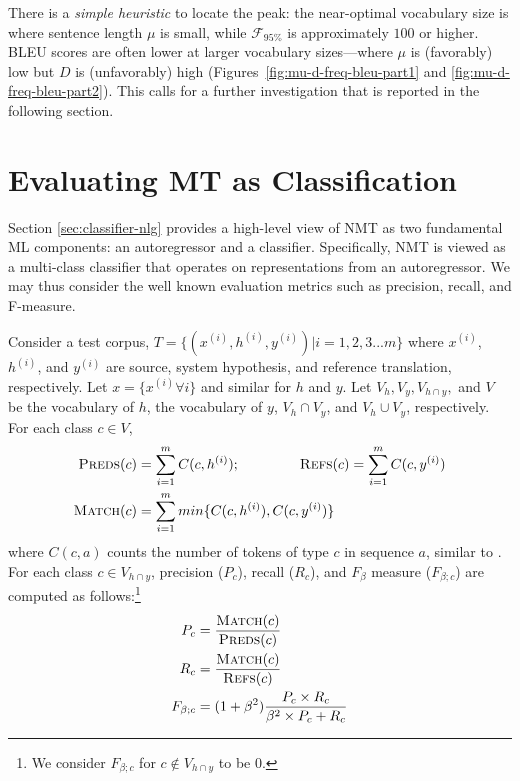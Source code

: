  There is a \textit{simple heuristic} to locate the peak: the near-optimal vocabulary size is where sentence length $\mu$ is small, while $\mathcal{F}_{95\%}$ is approximately $100$ or higher.
BLEU scores are often lower at larger vocabulary sizes---where $\mu$ is (favorably) low but $D$ is (unfavorably) high (Figures~\ref{fig:mu-d-freq-bleu-part1} and \ref{fig:mu-d-freq-bleu-part2}).
This calls for a further investigation that is reported in the following section.

\section{Evaluating MT as Classification}
\label{sec:mt-eval-as-cls}

Section \ref{sec:classifier-nlg} provides a high-level view of NMT as two fundamental ML components: an autoregressor and a classifier. 
Specifically, NMT is viewed as a multi-class classifier that operates on representations from an autoregressor.
We may thus consider the well known evaluation metrics such as precision, recall, and F-measure.

Consider a test corpus, $T = \{ (x^{(i)}, h^{(i)}, y^{(i)}) | i = 1,2,3...m \}$ where $x^{(i)}$, $h^{(i)}$, and $y^{(i)}$ are source, system hypothesis, and reference translation, respectively. Let $x = \{x^{(i)} \forall i\}$ and similar for $h$ and $y$.  Let $V_h, V_y, V_{h\cap y},$ and $V$ be the vocabulary of $h$, the vocabulary of $y$, $V_h \cap V_y$, and $V_h \cup V_y$, respectively.
For each class $c \in V$, 
\begin{align*}
 \textsc{Preds}(c) &= \sum_{i=1}^m C(c, h^{(i)}) ; \hspace*{1.5cm} \textsc{Refs}(c) = \sum_{i=1}^m C(c, y^{(i)})\\
\textsc{Match}(c) &= \sum_{i=1}^m min\{C(c, h^{(i)}), C(c, y^{(i)})\} 
\end{align*}
\noindent where $C(c, a)$  counts the number of tokens of type $c$ in sequence $a$, similar to \citet{papineni-etal-2002-bleu}. 
For each class $c \in V_{h \cap y}$, precision ($P_c$), recall ($R_c$), and $F_\beta$ measure ($F_{\beta;c}$) are computed as follows:\footnote{We consider $F_{\beta;c}$ for $c \not\in V_{h \cap y}$ to be 0.}
\begin{align*}
    P_c &= \frac{\textsc{Match}(c)}{\textsc{Preds}(c)} \\
    R_c &= \frac{\textsc{Match}(c)}{\textsc{Refs}(c)} \\
    F_{\beta;c} &= (1 + \beta^2)  \frac{ P_c \times R_c}{ \beta^2 \times P_c + R_c}
\end{align*}

